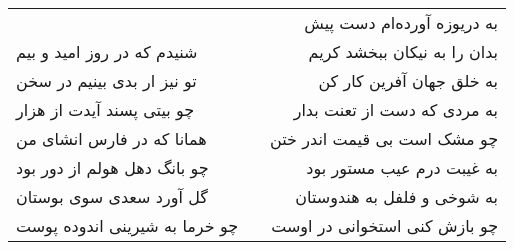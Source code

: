 \begin{center}
\begin{longtable}{l p{0.5cm} r}
&&
به دریوزه آورده‌ام دست پیش
\\
شنیدم که در روز امید و بیم
&&
بدان را به نیکان ببخشد کریم
\\
تو نیز ار بدی بینیم در سخن
&&
به خلق جهان آفرین کار کن
\\
چو بیتی پسند آیدت از هزار
&&
به مردی که دست از تعنت بدار
\\
همانا که در فارس انشای من
&&
چو مشک است بی قیمت اندر ختن
\\
چو بانگ دهل هولم از دور بود
&&
به غیبت درم عیب مستور بود
\\
گل آورد سعدی سوی بوستان
&&
به شوخی و فلفل به هندوستان
\\
چو خرما به شیرینی اندوده پوست
&&
چو بازش کنی استخوانی در اوست
\\
\end{longtable}
\end{center}
